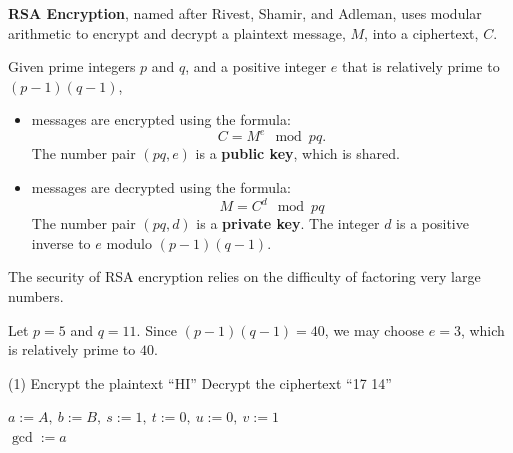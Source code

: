 \documentclass[../mathNotesPreamble]{subfiles}
\begin{document}
  \begin{defn*}
    \textbf{RSA Encryption}, named after Rivest, Shamir, and Adleman, uses modular arithmetic to encrypt and decrypt a plaintext message, $M$, into a ciphertext, $C$.

    Given prime integers $p$ and $q$, and a positive integer $e$ that is relatively prime to $(p-1)(q-1)$,
    \begin{itemize}
      \item
         messages are encrypted using the formula:
          \[C = M^e \mod pq.\]
        The number pair $(pq,e)$ is a \textbf{public key}, which is shared.

      \item
        messages are decrypted using the formula:
          \[M = C^d \mod pq\]
        The number pair $(pq,d)$ is a \textbf{private key}. The integer $d$ is a positive inverse to $e$ modulo $(p-1)(q-1)$.
    \end{itemize}
    The security of RSA encryption relies on the difficulty of factoring very large numbers.
  \end{defn*}
  \pagebreak

  \begin{ex*}
    Let $p=5$ and $q=11$. Since $(p-1)(q-1)=40$, we may choose $e=3$, which is relatively prime to $40$.
    \begin{extasks}[after-item-skip=\stretch{1}](1)
      \task Encrypt the plaintext ``HI''
      \task Decrypt the ciphertext ``17 14''
    \end{extasks}
  \end{ex*}
  \pagebreak

  \begin{algorithm}[H]
    \LinesNotNumbered
    \TabPositions{40mm}

    $a:=A,\ b:=B,\ s:=1,\ t:=0,\ u:=0,\ v:=1$\\
    $\gcd:=a$\\
    \caption{Algorithm 8.4.1: Extended Euclidean Algorithm}
  \end{algorithm}

  \pagebreak
\end{document}

